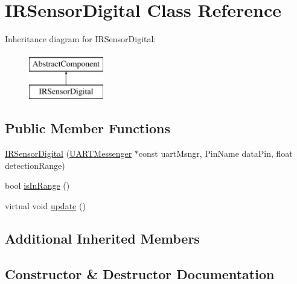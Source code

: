 \hypertarget{class_i_r_sensor_digital}{}\section{I\+R\+Sensor\+Digital Class Reference}
\label{class_i_r_sensor_digital}
Inheritance diagram for I\+R\+Sensor\+Digital\+:\begin{figure}[H]
\begin{center}
\leavevmode
\includegraphics[height=2.000000cm]{class_i_r_sensor_digital}
\end{center}
\end{figure}
\subsection*{Public Member Functions}
\begin{DoxyCompactItemize}
\item 
\hyperlink{class_i_r_sensor_digital_a43d7d836d07616260611d3cef709dff1}{I\+R\+Sensor\+Digital} (\hyperlink{class_u_a_r_t_messenger}{U\+A\+R\+T\+Messenger} $\ast$const uart\+Msngr, Pin\+Name data\+Pin, float detection\+Range)
\item 
bool \hyperlink{class_i_r_sensor_digital_a749b91dae3e83900f6de49fcc908470d}{is\+In\+Range} ()
\item 
virtual void \hyperlink{class_i_r_sensor_digital_a8d09a546a1f4b4c6533c324d98a146a9}{update} ()
\end{DoxyCompactItemize}
\subsection*{Additional Inherited Members}


\subsection{Constructor \& Destructor Documentation}
\mbox{\label{class_i_r_sensor_digital_a43d7d836d07616260611d3cef709dff1}} 
